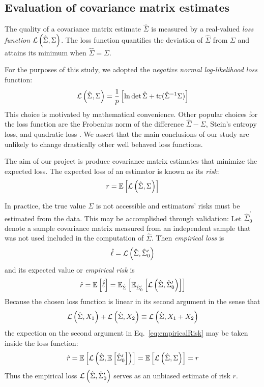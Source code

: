 \subsection*{Evaluation of covariance matrix estimates}
The quality of a covariance matrix estimate $\hat\Sigma$ is measured by a real-valued \emph{loss function} $\mathcal L\left(\hat\Sigma,\Sigma\right)$.  The loss function quantifies the deviation of $\hat\Sigma$ from $\Sigma$ and attains its minimum  when $\hat\Sigma = \Sigma$. 

For the purposes of this study, we adopted the \emph{negative normal log-likelihood loss} function:
\begin{equation}\label{eq:loss}
\mathcal L\left(\hat\Sigma,\Sigma\right) = \frac 1 p\left[\ln \det \hat \Sigma + \operatorname{tr}(\hat \Sigma^{-1}\Sigma)\right]
\end{equation}
This choice is motivated by mathematical convenience. Other popular choices for the loss function are the Frobenius norm of the difference $\hat\Sigma-\Sigma$, Stein's entropy loss, and quadratic loss \cite{James:1961,Ledoit:2004,Schafer:2005,Fan:2008}.  We assert that the main conclusions of our study are unlikely to change drastically other well behaved loss functions.

The aim of our project is produce covariance matrix estimates that minimize the expected loss.  The expected loss of an estimator is known as its \emph{risk}: 
\begin{equation}
r = \mathbb E\left[ \mathcal L\left(\hat\Sigma, \Sigma\right)\right]
\end{equation}

In practice, the true value $\Sigma$ is not accessible and estimators' risks must be estimated from the data.  This may be accomplished through validation: 
Let $\hat\Sigma_0^\prime$ denote a sample covariance matrix measured from an independent sample that was not used included in the computation of $\hat\Sigma$. Then \emph{empirical loss} is 
\begin{equation}
\hat \ell = \mathcal L\left(\hat\Sigma,\hat\Sigma_0^\prime\right)
\end{equation}
 and its expected value or \emph{empirical risk} is
\begin{equation}\label{eq:empiricalRisk}
\hat r = \mathbb E\left[ \hat\ell\right] = \mathbb E_{\hat\Sigma} \left[ \mathbb E_{\hat\Sigma_0^\prime} \left[ {\mathcal L\left(\hat\Sigma,\hat\Sigma_0^\prime\right)} \right] \right]
\end{equation}
Because the chosen loss function is linear in its second argument in the sense that
\begin{equation}
\mathcal L\left(\hat\Sigma,X_1\right) + \mathcal L\left(\hat\Sigma,X_2\right) \equiv \mathcal L\left(\hat\Sigma,X_1+X_2\right)
\end{equation}
the expection on the second argument in Eq.~\ref{eq:empiricalRisk} may be taken inside the loss function:
\begin{equation}
\hat r = \mathbb E\left[ \mathcal L\left(\hat\Sigma,\mathbb E\left[ \hat\Sigma_0^\prime\right]\right)\right]  = \mathbb E\left[ \mathcal L\left(\hat\Sigma,\Sigma\right)\right] = r
\end{equation}
Thus the empirical loss $\mathcal L\left(\hat \Sigma,\hat \Sigma_0^\prime\right)$ serves as an unbiased estimate of risk $r$. 

